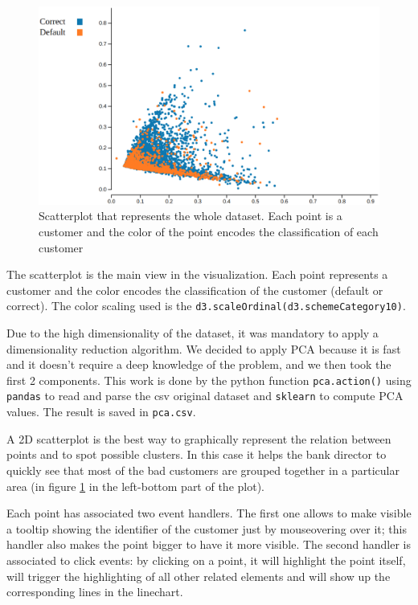 \documentclass[journal]{vgtc}                %
\begin{document}
\begin{figure}[h]
  \includegraphics[scale=0.15]{scatterplot}
  \caption{Scatterplot that represents the whole dataset. Each point is a customer and the color of the point encodes the classification of each customer}
  \label{scatterplot}
\end{figure}
The scatterplot is the main view in the visualization. Each point represents a customer and the color encodes the classification of the customer (default or correct). The color scaling used is the \texttt{d3.scaleOrdinal(d3.schemeCategory10)}.

Due to the high dimensionality of the dataset, it was mandatory to apply a dimensionality reduction algorithm. We decided to apply PCA because it is fast and it doesn't require a deep knowledge of the problem, and we then took the first 2 components. This work is done by the python function \texttt{pca.action()} using \texttt{pandas} to read and parse the csv original dataset
and \texttt{sklearn} to compute PCA values. The result is saved in \texttt{pca.csv}.

A 2D scatterplot is the best way to graphically represent the relation between points and to spot possible clusters. In this case it helps the bank director to quickly see that most of the bad customers are grouped together in a particular area (in figure \ref{scatterplot} in the left-bottom part of the plot).

Each point has associated two event handlers. The first one allows to make visible a tooltip showing the identifier of the customer just by mouseovering over it; this handler also makes the point bigger to have it more visible.
The second handler is associated to click events: by clicking on a point, it will highlight the point itself, will trigger the highlighting of all other related elements and will show up the corresponding lines in the linechart.
\end{document}
